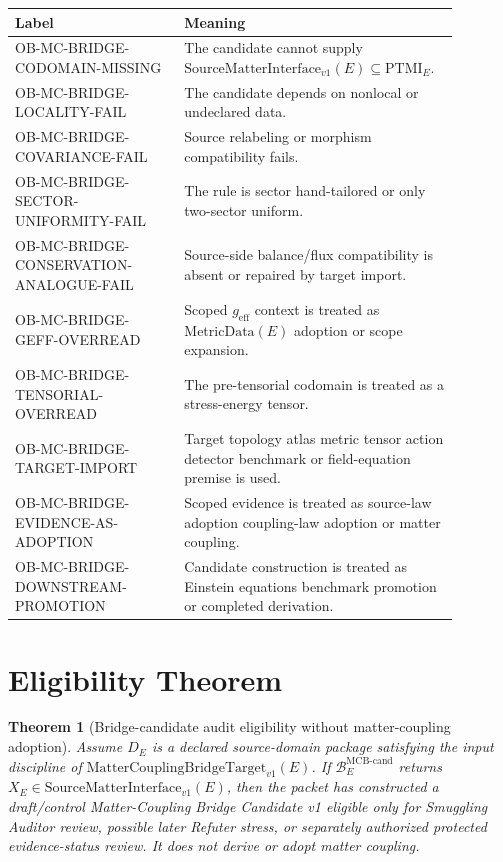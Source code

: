 \documentclass[11pt]{article}
\newcommand{\MetricData}{\mathrm{MetricData}}
\newcommand{\geff}{g_{\mathrm{eff}}}
\newcommand{\MCBT}{\mathrm{MatterCouplingBridgeTarget}_{v1}}
\newcommand{\SMI}{\mathrm{SourceMatterInterface}_{v1}}
\newcommand{\PTMI}{\mathrm{PTMI}}
\newtheorem{theorem}{Theorem}
\begin{document}
\begin{longtable}{p{0.36\linewidth}p{0.52\linewidth}}
\toprule
Label & Meaning \\
\midrule
OB-MC-BRIDGE-CODOMAIN-MISSING & The candidate cannot supply \(\SMI(E)\subseteq\PTMI_E\). \\
OB-MC-BRIDGE-LOCALITY-FAIL & The candidate depends on nonlocal or undeclared data. \\
OB-MC-BRIDGE-COVARIANCE-FAIL & Source relabeling or morphism compatibility fails. \\
OB-MC-BRIDGE-SECTOR-UNIFORMITY-FAIL & The rule is sector hand-tailored or only two-sector uniform. \\
OB-MC-BRIDGE-CONSERVATION-ANALOGUE-FAIL & Source-side balance/flux compatibility is absent or repaired by target import. \\
OB-MC-BRIDGE-GEFF-OVERREAD & Scoped \(\geff\) context is treated as \(\MetricData(E)\) adoption or scope expansion. \\
OB-MC-BRIDGE-TENSORIAL-OVERREAD & The pre-tensorial codomain is treated as a stress-energy tensor. \\
OB-MC-BRIDGE-TARGET-IMPORT & Target topology atlas metric tensor action detector benchmark or field-equation premise is used. \\
OB-MC-BRIDGE-EVIDENCE-AS-ADOPTION & Scoped evidence is treated as source-law adoption coupling-law adoption or matter coupling. \\
OB-MC-BRIDGE-DOWNSTREAM-PROMOTION & Candidate construction is treated as Einstein equations benchmark promotion or completed derivation. \\
\bottomrule
\end{longtable}

\section{Eligibility Theorem}

\begin{theorem}[Bridge-candidate audit eligibility without matter-coupling adoption]
Assume \(D_E\) is a declared source-domain package satisfying the input
discipline of \(\MCBT(E)\). If \(\mathcal{B}^{\mathrm{MCB\text{-}cand}}_E\)
returns \(X_E\in\SMI(E)\), then the packet has constructed a draft/control
Matter-Coupling Bridge Candidate v1 eligible only for Smuggling Auditor
review, possible later Refuter stress, or separately authorized protected
evidence-status review. It does not derive or adopt matter coupling.
\end{theorem}
\end{document}
